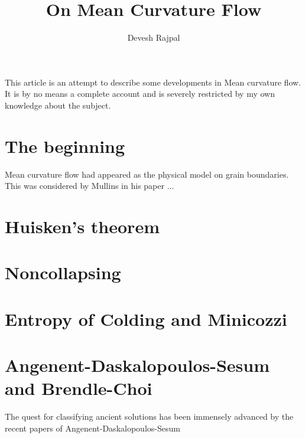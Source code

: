 \documentclass[12pt,a4paper]{scrarticle}
\title{\LARGE On Mean Curvature Flow}
\author{\large Devesh Rajpal}
\date{}
\begin{document}
    \maketitle
    This article is an attempt to describe some developments in Mean curvature flow. It is by no means a complete account and is severely restricted by my own knowledge about the subject.

    \section{The beginning}

    Mean curvature flow had appeared as the physical model on grain boundaries. This was considered by Mullins in his paper ... 


    \section{Huisken's theorem}

    \section{Noncollapsing}

    \section{Entropy of Colding and Minicozzi}

    \section{Angenent-Daskalopoulos-Sesum and Brendle-Choi}
    
    The quest for classifying ancient solutions has been immensely advanced by the recent papers of Angenent-Daskalopoulos-Sesum
\end{document}
